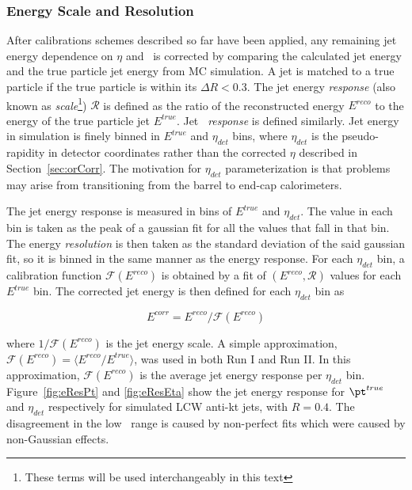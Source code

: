\subsubsection{Energy Scale and Resolution}
\label{sec:jes}
\par After calibrations schemes described so far have been applied, any remaining jet energy dependence 
on $\eta$ and \pt\ is corrected by comparing the calculated jet energy and the true 
particle jet energy from MC simulation. A jet is matched to a true particle if the true particle 
is within its $\Delta R<0.3$. The jet energy {\it response} (also known as {\it scale}\footnote{These 
terms will be used interchangeably in this text}) $\mathcal{R}$ is defined as the ratio of the 
reconstructed energy $E^{reco}$ to the energy of the true particle jet $E^{true}$. Jet {\it \pt\ 
response} is defined similarly. Jet energy in simulation is finely binned in $E^{true}$ and $\eta_{det}$ bins, 
where $\eta_{det}$ is the pseudo-rapidity in detector coordinates rather than the corrected $\eta$ 
described in Section~\ref{sec:orCorr}. The motivation for $\eta_{det}$ parameterization is that problems may arise from transitioning 
from the barrel to end-cap calorimeters.

\par The jet energy response is measured in bins of $E^{true}$ and $\eta_{det}$. The value in each bin 
is taken as the peak of a gaussian fit for all the values that fall in that bin. 
The energy {\it resolution} is then taken as the standard deviation of the said gaussian 
fit, so it is binned in the same manner as the energy response.  
For each $\eta_{det}$ bin, a calibration function $\mathcal{F}(E^{reco})$ is obtained by a fit of 
$(E^{reco},\mathcal{R})$ values for each $E^{true}$ bin. The corrected jet energy is then 
defined for each $\eta_{det}$ bin as 

\begin{equation}
E^{corr} = E^{reco}/\mathcal{F}(E^{reco})
\end{equation}

where $1/\mathcal{F}(E^{reco})$ is the jet energy scale. A simple approximation, 
$\mathcal{F}(E^{reco}) = \langle E^{reco}/E^{true}\rangle$, was used in both Run I and Run II. 
In this approximation, $\mathcal{F}(E^{reco})$ is the average jet energy response per $\eta_{det}$
bin. Figure~\ref{fig:eResPt} and \ref{fig:eResEta} show the jet energy response for $\pt^{true}$ and $\eta_{det}$ respectively for 
simulated LCW anti-kt jets, with $R=0.4$. The disagreement in the low \pt\ range is caused by non-perfect 
fits which were caused by non-Gaussian effects. 

